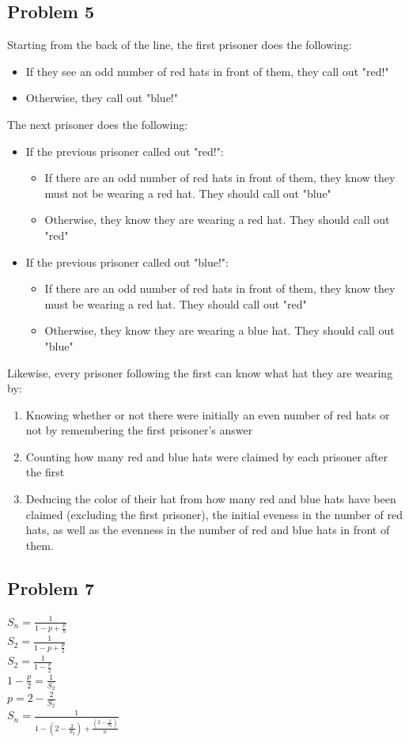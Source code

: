 \documentclass[]{article}
\begin{document}
\subsection{Problem 5}
Starting from the back of the line, the first prisoner does the following:
\begin{itemize}
	\item If they see an odd number of red hats in front of them, they call out "red!"
	\item Otherwise, they call out "blue!"
\end{itemize}
The next prisoner does the following:
\begin{itemize}
	\item If the previous prisoner called out "red!":
	\begin{itemize}
		\item If there are an odd number of red hats in front of them, they know they must not be wearing a red hat. They should call out "blue"
		\item Otherwise, they know they are wearing a red hat. They should call out "red"
	\end{itemize}
	\item If the previous prisoner called out "blue!":
	\begin{itemize}
		\item If there are an odd number of red hats in front of them, they know they must be wearing a red hat. They should call out "red"
		\item Otherwise, they know they are wearing a blue hat. They should call out "blue"
	\end{itemize}
\end{itemize}
Likewise, every prisoner following the first can know what hat they are wearing by:
\begin{enumerate}
	\item Knowing whether or not there were initially an even number of red hats or not by remembering the first prisoner's answer
	\item Counting how many red and blue hats were claimed by each prisoner after the first
	\item Deducing the color of their hat from how many red and blue hats have been claimed (excluding the first prisoner), the initial eveness in the number of red hats, as well as the evenness in the number of red and blue hats in front of them.
\end{enumerate}
\subsection{Problem 7}
$S_n = \frac{1}{1 - p + \frac{p}{n}}$ \\
$S_2 = \frac{1}{1 - p + \frac{p}{2}}$ \\
$S_2 = \frac{1}{1 - \frac{p}{2}}$ \\
$1 - \frac{p}{2} = \frac{1}{S_2}$ \\
$p = 2 - \frac{2}{S_2}$ \\
$S_n = \frac{1}{1 - (2 - \frac{2}{S_2}) + \frac{(2 - \frac{2}{S_2})}{n}}$\\
\end{document}
